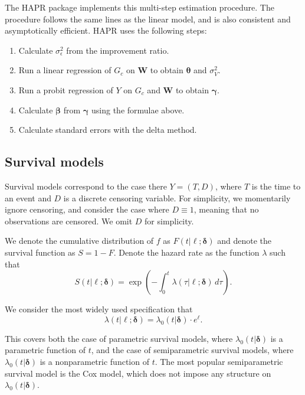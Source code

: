 \documentclass[12pt]{article}
\begin{document}
The HAPR package implements this multi-step estimation procedure. The procedure follows the same lines as the linear model, and is also consistent and asymptotically efficient. HAPR uses the following steps:

\begin{enumerate}
    \item Calculate $\sigma^2_\epsilon$ from the improvement ratio.
    \item Run a linear regression of $G_c$ on $\boldsymbol W$ to obtain $\boldsymbol \theta$ and $\sigma^2_V$.
    \item Run a probit regression of $Y$ on $G_c$ and $\boldsymbol W$ to obtain $\boldsymbol{\gamma}$.
    \item Calculate $\boldsymbol{\beta}$ from $\boldsymbol{\gamma}$ using the formulae above.
    \item Calculate standard errors with the delta method.
\end{enumerate}


\subsection{Survival models}
\label{sec:survival_models}
Survival models correspond to the case there $Y = (T, D)$, where $T$ is the time to an event and $D$ is a discrete censoring variable. For simplicity, we momentarily ignore censoring, and consider the case where $D \equiv 1$, meaning that no observations are censored. We omit $D$ for simplicity.

We denote the cumulative distribution of $f$ as $F(t | \ell ; \boldsymbol \delta)$ and denote the survival function as $S = 1-F$. Denote the hazard rate as the function $\lambda$ such that
\[
    S(t | \ell ; \boldsymbol \delta)
    =
    \exp\left(-\int_0^t \lambda(\tau | \ell ; \boldsymbol \delta) \, d\tau\right)
    \text{.}
\]

We consider the most widely used specification that
\begin{equation}
    \label{eq:parametric_hazard}
    \lambda(t |\ell ; \boldsymbol{\delta})
    =
    \lambda_0(t | \boldsymbol{\delta}) \cdot e^\ell
    \text{.}
\end{equation}

This covers both the case of parametric survival models, where $\lambda_0(t | \boldsymbol{\delta})$ is a parametric function of $t$, and the case of semiparametric survival models, where $\lambda_0(t | \boldsymbol{\delta})$ is a nonparametric function of $t$. The most popular semiparametric survival model is the Cox model, which does not impose any structure on $\lambda_0(t | \boldsymbol{\delta})$.
\end{document}
